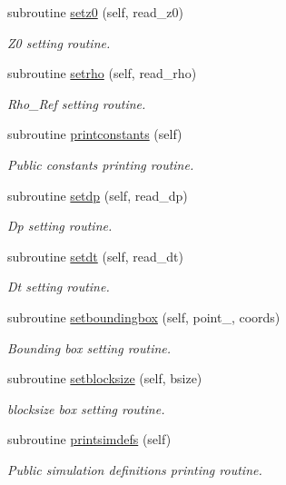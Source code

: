 \begin{DoxyCompactItemize}
subroutine \hyperlink{namespacesimulation__globals__mod_a64b1d91147c1cd5898fec8f23d56a65d}{setz0} (self, read\+\_\+z0)
\begin{DoxyCompactList}\small\item\em Z0 setting routine. \end{DoxyCompactList}\item 
subroutine \hyperlink{namespacesimulation__globals__mod_a68a87c39cf88bad353e28e367a721ed4}{setrho} (self, read\+\_\+rho)
\begin{DoxyCompactList}\small\item\em Rho\+\_\+\+Ref setting routine. \end{DoxyCompactList}\item 
subroutine \hyperlink{namespacesimulation__globals__mod_a20ba28d72a9bea823d9373a94f97026e}{printconstants} (self)
\begin{DoxyCompactList}\small\item\em Public constants printing routine. \end{DoxyCompactList}\item 
subroutine \hyperlink{namespacesimulation__globals__mod_acb8e3762572266b40a0deb166dded33a}{setdp} (self, read\+\_\+dp)
\begin{DoxyCompactList}\small\item\em Dp setting routine. \end{DoxyCompactList}\item 
subroutine \hyperlink{namespacesimulation__globals__mod_aecf75eeccef4eeae6d10ab26cf2dcfcf}{setdt} (self, read\+\_\+dt)
\begin{DoxyCompactList}\small\item\em Dt setting routine. \end{DoxyCompactList}\item 
subroutine \hyperlink{namespacesimulation__globals__mod_a412b0779703630189e2ea14e4b390864}{setboundingbox} (self, point\+\_\+, coords)
\begin{DoxyCompactList}\small\item\em Bounding box setting routine. \end{DoxyCompactList}\item 
subroutine \hyperlink{namespacesimulation__globals__mod_aa65b43534d2d2b6366a4ebc791194805}{setblocksize} (self, bsize)
\begin{DoxyCompactList}\small\item\em blocksize box setting routine. \end{DoxyCompactList}\item 
subroutine \hyperlink{namespacesimulation__globals__mod_ad331ccf019de7ed531e37c655600f90f}{printsimdefs} (self)
\begin{DoxyCompactList}\small\item\em Public simulation definitions printing routine. \end{DoxyCompactList}\end{DoxyCompactItemize}
